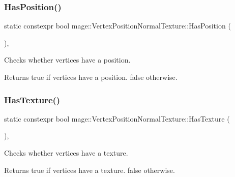 \subsubsection{\texorpdfstring{Has\+Position()}{HasPosition()}}
{\footnotesize\ttfamily static constexpr bool mage\+::\+Vertex\+Position\+Normal\+Texture\+::\+Has\+Position (\begin{DoxyParamCaption}{ }\end{DoxyParamCaption})\hspace{0.3cm}{\ttfamily [static]}, {\ttfamily [noexcept]}}

Checks whether vertices have a position.

\begin{DoxyReturn}{Returns}
{\ttfamily true} if vertices have a position. {\ttfamily false} otherwise. 
\end{DoxyReturn}
\hypertarget{structmage_1_1_vertex_position_normal_texture_aaf6ed21e4aa9b5aa9be520f7541851a1}{}\label{structmage_1_1_vertex_position_normal_texture_aaf6ed21e4aa9b5aa9be520f7541851a1} 
\subsubsection{\texorpdfstring{Has\+Texture()}{HasTexture()}}
{\footnotesize\ttfamily static constexpr bool mage\+::\+Vertex\+Position\+Normal\+Texture\+::\+Has\+Texture (\begin{DoxyParamCaption}{ }\end{DoxyParamCaption})\hspace{0.3cm}{\ttfamily [static]}, {\ttfamily [noexcept]}}

Checks whether vertices have a texture.

\begin{DoxyReturn}{Returns}
{\ttfamily true} if vertices have a texture. {\ttfamily false} otherwise. 
\end{DoxyReturn}
\hypertarget{structmage_1_1_vertex_position_normal_texture_a9bd46fd18856265e02f5332d618f3a23}{}\label{structmage_1_1_vertex_position_normal_texture_a9bd46fd18856265e02f5332d618f3a23} 
